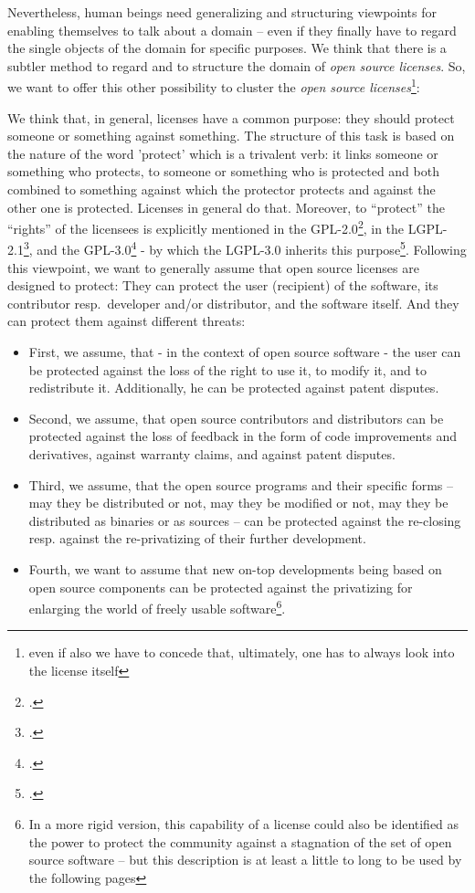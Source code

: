 Nevertheless, human beings need generalizing and structuring viewpoints for
enabling themselves to talk about a domain -- even if they finally have to
regard the single objects of the domain for specific purposes. We think that
there is a subtler method to regard and to structure the domain of \emph{open
source licenses}. So, we want to offer this other possibility to cluster the
\emph{open source licenses}\footnote{even if also we have to concede that,
ultimately, one has to always look into the license itself}:

We think that, in general, licenses have a common purpose: they should protect
someone or something against something. The structure of this task is based on
the nature of the word 'protect' which is a trivalent verb: it links someone or
something who protects, to someone or something who is protected and both
combined to something against which the protector protects and against the other
one is protected. Licenses in general do that. Moreover, to \enquote{protect}
the \enquote{rights} of the licensees is explicitly mentioned in the
GPL-2.0\footcite[cf.][\nopage wp, Preamble]{Gpl20OsiLicense1991a}, in the
LGPL-2.1\footcite[cf.][\nopage wp, Preamble]{Lgpl21OsiLicense1999a}, and the
GPL-3.0\footcite[cf.][\nopage wp, Preamble]{Gpl30OsiLicense2007a} - by which the
LGPL-3.0 inherits this purpose\footcite[cf.][\nopage wp,
prefix]{Lgpl30OsiLicense2007a}. Following this viewpoint, we want to generally
assume that open source licenses are designed to protect: They can protect
the user (recipient) of the software, its contributor resp.\ developer and/or
distributor, and the software itself. And they can protect them against
different threats:

\begin{itemize}
  \item First, we assume, that - in the context of open source software - the
  user can be protected against the loss of the right to use it, to modify it,
  and to redistribute it. Additionally, he can be protected against patent
  disputes.
  \item Second, we assume, that open source contributors and distributors can be
  protected against the loss of feedback in the form of code improvements and
  derivatives, against warranty claims, and against patent disputes.
  \item Third, we assume, that the open source programs and their specific forms
  -- may they be distributed or not, may they be modified or not, may they be
  distributed as binaries or as sources -- can be protected against the
  re-closing resp. against the re-privatizing of their further development.
  \item Fourth, we want to assume that new on-top developments being based on
  open source components can be protected against the privatizing for enlarging
  the world of freely usable software\footnote{In a more rigid version, this
  capability of a license could also be identified as the power to protect the
  community against a stagnation of the set of open source software -- but this
  description is at least a little to long to be used by the following pages}.
\end{itemize}

